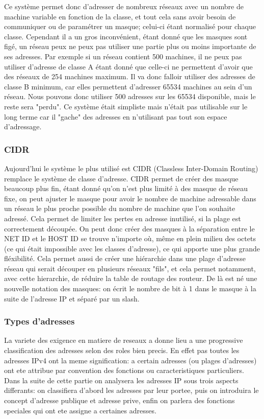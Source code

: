 Ce système permet donc d'adresser de nombreux réseaux avec un nombre de machine
variable en fonction de la classe, et tout cela sans avoir besoin de
communiquer ou de paramétrer un masque; celui-ci étant normalisé pour chaque
classe.  Cependant il a un gros inconvénient, étant donné que les masques sont
figé, un réseau peux ne peux pas utiliser une partie plus ou moins importante
de ses adresses. Par exemple si un réseau contient 500 machines, il ne peux pas
utiliser d'adresse de classe A étant donné que celle-ci ne permettent d'avoir
que des réseaux de 254 machines maximum. Il va donc falloir utiliser des
adresses de classe B minimum, car elles permettent d'adresser 65534 machines au
sein d'un réseau. Nous pouvons donc utiliser 500 adresses sur les 65534
disponible, mais le reste sera "perdu".  Ce système était simpliste mais
n'était pas utilisable sur le long terme car il "gache" des adresses en
n'utilisant pas tout son espace d'adressage.


\subsubsection{CIDR}

Aujourd'hui le système le plus utilisé est CIDR (Classless Inter-Domain
Routing) remplace le système de classe d'adresse. CIDR permet de créer des
masque beaucoup plus fin, étant donné qu'on n'est plus limité à des masque de
réseau fixe, on peut ajuster le masque pour avoir le nombre de machine
adressable dans un réseau le plus proche possible du nombre de machine que l'on
souhaite adressé.  Cela permet de limiter les pertes en adresse inutilisé, si
la plage est correctement découpée.  On peut donc créer des masques à la
séparation entre le NET ID et le HOST ID se trouve n'importe où, même en plein
milieu des octets (ce qui était impossible avec les classes d'adresse), ce qui
apporte une plus grande fléxibilité.  Cela permet aussi de créer une hiérarchie
dans une plage d'adresse réseau qui serait découper en plusieurs réseaux
"fils", et cela permet notamment, avec cette hierarchie, de réduire la table de
routage des routeur.  De là est né une nouvelle notation des masques: on écrit
le nombre de bit à 1 dans le masque à la suite de l'adresse IP et séparé par un
slash.







\subsubsection{Types d'adresses}
La variete des exigence en matiere de reseaux a donne lieu a une progressive
classification des adresses selon des roles bien precis.  En effet pas toutes
les adresses IPv4 ont la meme signification: a certain adresses (ou plages
d'adresses) ont ete attribue par convention des fonctions ou caracteristiques
particuliers.  Dans la suite de cette partie on analysera les adresses IP sous
trois aspects differants: on classifiera d'abord les adresses par leur portee, 
puis on introduira le concept d'adresse publique et adresse prive, enfin
on parlera des fonctions speciales qui ont ete assigne a certaines adresses.


